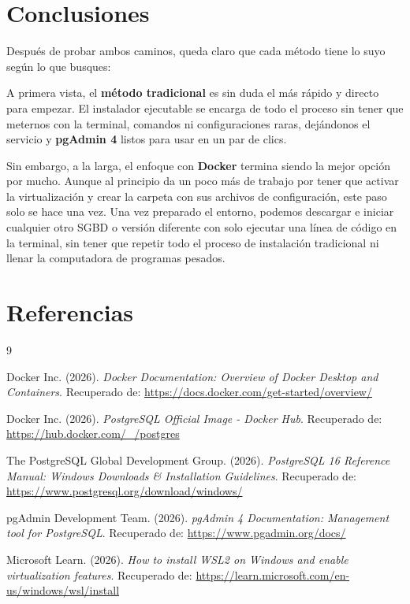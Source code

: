 \documentclass[11pt, a4paper]{article}
\begin{document}
\section{Conclusiones}

Después de probar ambos caminos, queda claro que cada método tiene lo suyo según lo que busques:

A primera vista, el \textbf{método tradicional} es sin duda el más rápido y directo para empezar. El instalador ejecutable se encarga de todo el proceso sin tener que meternos con la terminal, comandos ni configuraciones raras, dejándonos el servicio y \textbf{pgAdmin 4} listos para usar en un par de clics.

Sin embargo, a la larga, el enfoque con \textbf{Docker} termina siendo la mejor opción por mucho. Aunque al principio da un poco más de trabajo por tener que activar la virtualización y crear la carpeta con sus archivos de configuración, este paso solo se hace una vez. Una vez preparado el entorno, podemos descargar e iniciar cualquier otro SGBD o versión diferente con solo ejecutar una línea de código en la terminal, sin tener que repetir todo el proceso de instalación tradicional ni llenar la computadora de programas pesados.
\newpage
\section{Referencias}

\begin{thebibliography}{9}

    Docker Inc. (2026). 
    \textit{Docker Documentation: Overview of Docker Desktop and Containers}. 
    Recuperado de: \url{https://docs.docker.com/get-started/overview/}

    Docker Inc. (2026). 
    \textit{PostgreSQL Official Image - Docker Hub}. 
    Recuperado de: \url{https://hub.docker.com/_/postgres}

    The PostgreSQL Global Development Group. (2026). 
    \textit{PostgreSQL 16 Reference Manual: Windows Downloads \& Installation Guidelines}. 
    Recuperado de: \url{https://www.postgresql.org/download/windows/}

    pgAdmin Development Team. (2026). 
    \textit{pgAdmin 4 Documentation: Management tool for PostgreSQL}. 
    Recuperado de: \url{https://www.pgadmin.org/docs/}

    Microsoft Learn. (2026). 
    \textit{How to install WSL2 on Windows and enable virtualization features}. 
    Recuperado de: \url{https://learn.microsoft.com/en-us/windows/wsl/install}

\end{thebibliography}
\end{document}
